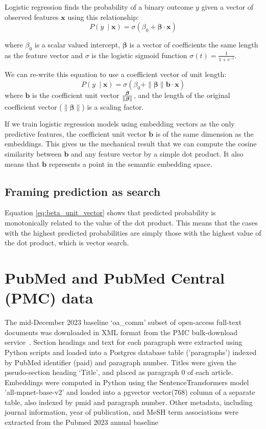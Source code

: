 \documentclass[letterpaper]{article} %
\begin{document}
Logistic regression finds the probability of a binary outcome $y$ given a vector of observed features $\mathbf{x}$ using this relationship:
\begin{equation}
P(y\ \mid \mathbf{x}) = \sigma ( \beta_0 + \boldsymbol\beta \cdot \mathbf{x} )
\end{equation}

\noindent where $\beta_0$ is a scalar valued intercept, $\boldsymbol\beta$ is a vector of coefficients the same length as the feature vector and $\sigma$ is the logistic sigmoid function $\sigma (t) = \frac{1}{1+e^{-t}}$.


We can re-write this equation to use a coefficient vector of unit length:
\begin{equation} \label{eq:beta_unit_vector}
P(y\ \mid \mathbf{x}) = \sigma ( \beta_0 + \|\boldsymbol\beta\| \boldsymbol{b} \cdot \mathbf{x} )
\end{equation}
where $\boldsymbol{b}$ is the coefficient unit vector ${\boldsymbol\beta \over \|\boldsymbol\beta\|}$, and the length of the original coefficient vector ($\|\boldsymbol\beta\|$) is a scaling factor.

If we train logistic regression models using embedding vectors as the only predictive features, the coefficient unit vector $\boldsymbol{b}$ is of the same dimension as the embeddings. This gives us the mechanical result that we can compute the cosine similarity between $\boldsymbol{b}$ and any feature vector by a simple dot product. It also means that $\boldsymbol{b}$ represents a point in the semantic embedding space.


\subsection{Framing prediction as search}

Equation \ref{eq:beta_unit_vector} shows that predicted probability is monotonically related to the value of the dot product. This means that the cases with the highest predicted probabilities are simply those with the highest value of the dot product, which is vector search.


\section{PubMed and PubMed Central (PMC) data}

The mid-December 2023 baseline ‘oa\_comm’ subset of open-access full-text documents was downloaded in XML format from the PMC bulk-download service~\cite{pmc_data}. Section headings and text for each paragraph were extracted using Python scripts and loaded into a Postgres database table ('paragraphs') indexed by PubMed identifier (paid) and paragraph number. Titles were given the pseudo-section heading ‘Title’, and placed as paragraph 0 of each article. Embeddings were computed in Python using the SentenceTransformers model 'all-mpnet-base-v2' and loaded into a pgvector vector(768) column of a separate table, also indexed by pmid and paragraph number.
Other metadata, including journal information, year of publication, and MeSH term associations were extracted from the Pubmed 2023 annual baseline~\cite{pubmed_data}
\end{document}
